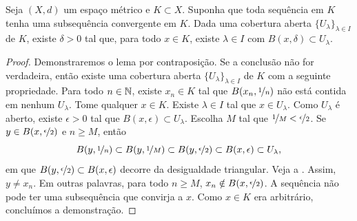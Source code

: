 \begin{lemma}\label{ms:lebesgue}
Seja $(X,d)$ um espaço métrico e $K \subset X$. Suponha que toda sequência
em $K$ tenha uma subsequência convergente em $K$. Dada
uma cobertura aberta $\{ U_\lambda \}_{\lambda \in I}$ de $K$, existe
$\delta > 0$ tal que, para todo $x \in K$, existe $\lambda \in I$
com $B(x,\delta) \subset U_\lambda$.
\end{lemma}

\begin{proof}
Demonstraremos o lema por contraposição.
Se a conclusão não for verdadeira, então existe
uma cobertura aberta $\{ U_\lambda \}_{\lambda \in I}$ de $K$ com
a seguinte propriedade.
Para todo $n \in {\mathbb{N}}$, existe $x_n \in K$ tal que
$B(x_n,\nicefrac{1}{n})$ não está contida em nenhum $U_\lambda$.
Tome qualquer $x \in K$. Existe
$\lambda \in I$ tal que $x \in U_\lambda$. Como $U_\lambda$ é aberto,
existe $\epsilon > 0$
tal que $B(x,\epsilon) \subset U_\lambda$. Escolha $M$ tal que
$\nicefrac{1}{M} < \nicefrac{\epsilon}{2}$. Se $y \in
B(x,\nicefrac{\epsilon}{2})$ e $n \geq M$, então
\begin{equation*}
B(y,\nicefrac{1}{n}) \subset
B(y,\nicefrac{1}{M}) \subset
B(y,\nicefrac{\epsilon}{2}) \subset B(x,\epsilon)
\subset U_\lambda ,
\end{equation*}
em que
$B(y,\nicefrac{\epsilon}{2}) \subset B(x,\epsilon)$
decorre da desigualdade triangular.
Veja a .
Assim, $y \neq x_n$.
Em outras palavras, para todo $n \geq M$, $x_n \notin B(x,\nicefrac{\epsilon}{2})$.
A sequência não pode ter uma subsequência que convirja a $x$. Como $x \in K$
era arbitrário, concluímos a demonstração.
\end{proof}

\begin{myfigureht}
\caption{Demonstração do lema da cobertura de Lebesgue.
Note que $B(y,\nicefrac{\epsilon}{2}) \subset
B(x,\epsilon)$ pela desigualdade triangular.\label{fig:lebesguedelta}}
\end{myfigureht}


